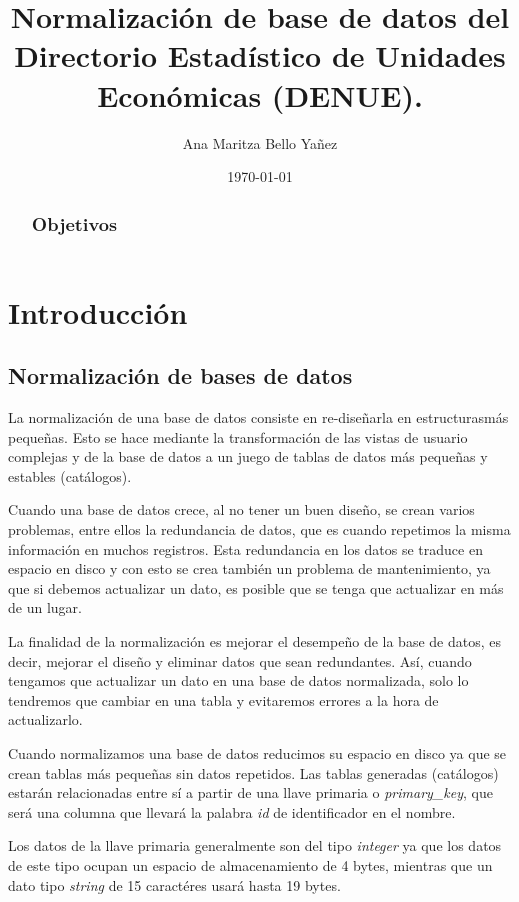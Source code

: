 \documentclass{article}
\title{Normalización de base de datos del Directorio Estadístico de Unidades Económicas (DENUE).}
\author{
    Ana Maritza Bello Yañez
}
\date{\today}
\begin{document}
\maketitle


\begin{abstract}
    \subsection{Objetivos}
\end{abstract}

\section{Introducción}

\subsection{Normalización de bases de datos}

La normalización de una base de datos consiste en re-diseñarla en estructurasmás
pequeñas. Esto se hace mediante la transformación de las vistas de
usuario complejas y de la base de datos a un juego de tablas de datos más
pequeñas y estables (catálogos).

Cuando una base de datos crece, al no tener un buen diseño, se crean varios
problemas, entre ellos la redundancia de datos, que es cuando repetimos la misma
información en muchos registros. Esta redundancia en los datos se traduce en
espacio en disco y con esto se crea también un problema de mantenimiento, ya que
si debemos actualizar un dato, es posible que se tenga que actualizar en más de
un lugar.

La finalidad de la normalización es mejorar el desempeño de la base de datos, es
decir, mejorar el diseño y eliminar datos que sean redundantes. Así, cuando
tengamos que actualizar un dato en una base de datos normalizada, solo lo
tendremos que cambiar en una tabla y evitaremos errores a la hora de
actualizarlo.

Cuando normalizamos una base de datos reducimos su espacio en disco ya que se
crean tablas más pequeñas sin datos repetidos. Las tablas generadas (catálogos)
estarán relacionadas entre sí a partir de una llave primaria o
\textit{primary\_key}, que será una columna que llevará la palabra
\textit{id} de identificador en el nombre. 

Los datos de la llave primaria generalmente son del tipo \textit{integer} ya que
los datos de este tipo ocupan un espacio de almacenamiento de 4 bytes, mientras
que un dato tipo \textit{string} de 15 caractéres usará hasta 19 bytes.
\end{document}
